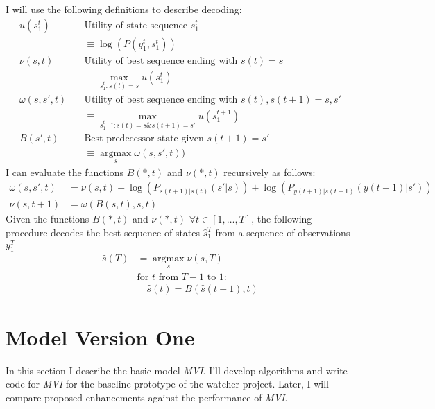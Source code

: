 \documentclass[11pt]{article}
\newcommand{\ti}[2]{{#1}{(#2)}}                         %
\newcommand{\ts}[4]{{#1}_{#3}^{#4}} %
\newcommand{\argmax}{\operatorname*{argmax}}
\begin{document}
I will use the following definitions to describe decoding:
\begin{align*}
  u(\ts{s}{\tau}{1}{t}) & \quad \text{Utility of state sequence }
  \ts{s}{\tau}{1}{t}\\
  & \quad \equiv \log \left( P(\ts{y}{\tau}{1}{t},\ts{s}{\tau}{1}{t}) \right)
  \\
  \nu(s,t) & \quad \text{Utility of best sequence ending with }
  \ti{s}{t} = s \\ 
  &  \quad \equiv \max_{\ts{s}{\tau}{1}{t}:\ti{s}{t}=s} u(\ts{s}{\tau}{1}{t}) \\
  \omega(s,s',t) & \quad \text{Utility of best sequence ending with }
  \ti{s}{t},\ti{s}{t+1} = s,s' \\
  &  \quad \equiv \max_{\ts{s}{\tau}{1}{t+1}:\ti{s}{t}=s \&\ti{s}{t+1}=s'}
  u(\ts{s}{\tau}{1}{t+1}) \\
  B(s',t) & \quad \text{Best predecessor state given } \ti{s}{t+1}=s'\\
  & \quad \equiv \argmax_{s} \omega(s,s',t))
\end{align*}
I can evaluate the functions $B(*,t)$ and $\nu(*,t)$ recursively as
follows:
\begin{align*}
  \omega(s,s',t) &= \nu(s,t) + \log\left( P_{\ti{s}{t+1}|\ti{s}{t}}(s'|s) \right) +
  \log\left( P_{\ti{y}{t+1}|\ti{s}{t+1}}(\ti{y}{t+1}|s') \right) \\
  \nu(s,t+1) &= \omega(B(s,t),s,t)
\end{align*}
Given the functions $B(*,t)$ and $\nu(*,t)$ $\forall
t\in[1,\ldots,T]$, the following procedure decodes the best sequence
of states $ \ts{\hat s}{\tau}{1}{T}$ from a sequence of observations $
\ts{y}{\tau}{1}{T}$
\begin{align*}
  {\ti{{\hat s}}{T}} &= \argmax_s \nu(s,T) \\
  & \text{for } t \text{ from } T-1 \text{ to } 1: \\
  & \quad \ti{\hat s}{t} = B( \ti{\hat s}{t+1},t)
\end{align*}

\section{Model Version One}
\label{sec:model1}

In this section I describe the basic model \emph{MVI}.  I'll develop
algorithms and write code for \emph{MVI} for the baseline prototype of
the watcher project.  Later, I will compare proposed enhancements
against the performance of \emph{MVI}.
\end{document}
